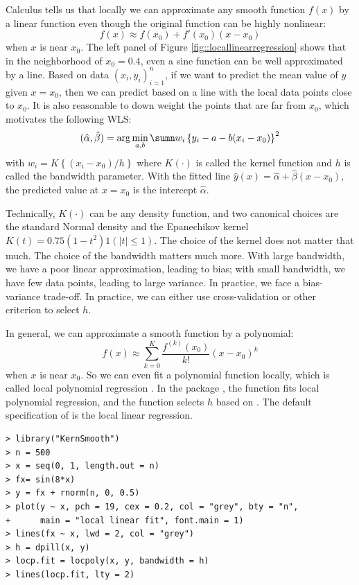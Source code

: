Calculus tells us that locally we can approximate any smooth function $f(x)$
by a linear function even though the original function can be highly
nonlinear:
$$
f(x) \approx  f(x_0) + f'(x_0) (x - x_0) 
$$
when $x$ is near $x_0$. 
The left panel of Figure \ref{fig::locallinearregression} shows that in the neighborhood of $x_0=0.4$, even a sine function can be well approximated by a line. Based on data $(x_{i},y_{i})_{i=1}^{n}$, if we want to
predict the mean value of $y$ given $x=x_{0}$, then we can predict
based on a line with the local data points close to $x_{0}$.
It is also reasonable to down weight the points that are far from $x_{0}$,
which motivates the following WLS:
\[
(\hat{\alpha},\hat{\beta})=\arg\min_{a,b}\sumn w_{i}\left\{ y_{i}-a-b(x_{i}-x_{0})\right\} ^{2}
\]
with $w_{i}=K\left\{ (x_i -x_{0})/h\right\} $ where $K(\cdot)$ is called
the kernel function and $h$ is called the bandwidth parameter. With
the fitted line $\hat{y}(x)=\hat{\alpha}+\hat{\beta}(x-x_{0})$,
the predicted value at $x=x_{0}$ is the intercept $\hat{\alpha}$. 

Technically, $K(\cdot)$ can be any density function, and two canonical
choices are the standard Normal density and the Epanechikov kernel
$K(t)=0.75(1-t^{2})1(|t|\leq1).$ The choice of the kernel does not
matter that much. The choice of the bandwidth matters much more.
With large bandwidth, we have a poor linear approximation, leading to
bias; with small bandwidth, we have few data points, leading to large
variance. In practice, we face a bias-variance trade-off. In practice, we can either use cross-validation or other criterion to select $h.$


In general, we can approximate a smooth function by a polynomial:
$$
f(x) \approx  \sum_{k=0}^K  \frac{  f^{(k)}(x_0)  }{k!}  (x - x_0)^k 
$$
when $x$ is near $x_0$. So
we can even fit a polynomial function locally, which is called local polynomial regression \citep{fan1996local}. 
In the  package , the function  fits local polynomial regression, and the function  selects $h$ based on \citet{ruppert1995effective}. The default specification of   is the local linear regression. 


\begin{lstlisting}
> library("KernSmooth")
> n = 500
> x = seq(0, 1, length.out = n)
> fx= sin(8*x)
> y = fx + rnorm(n, 0, 0.5)
> plot(y ~ x, pch = 19, cex = 0.2, col = "grey", bty = "n",
+      main = "local linear fit", font.main = 1)
> lines(fx ~ x, lwd = 2, col = "grey")
> h = dpill(x, y)
> locp.fit = locpoly(x, y, bandwidth = h)
> lines(locp.fit, lty = 2)
\end{lstlisting}



